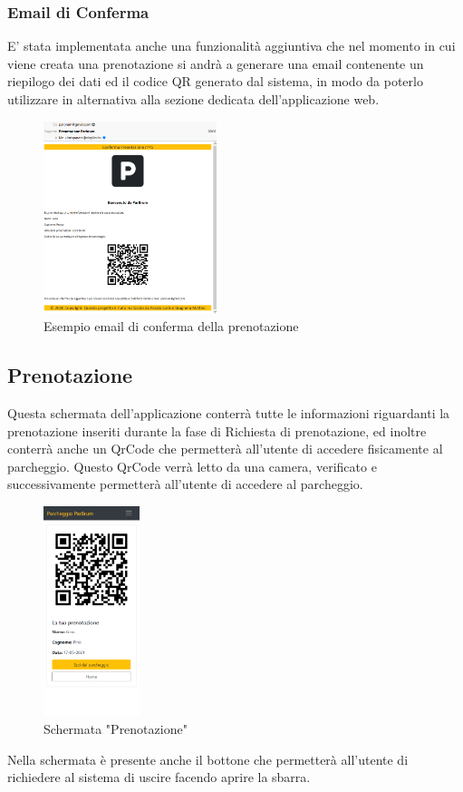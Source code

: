 \documentclass[a4paper,11pt]{report}
\begin{document}
\subsubsection{Email di Conferma}
E' stata implementata anche una funzionalità aggiuntiva che nel momento in cui viene creata una prenotazione si andrà a generare una email contenente un riepilogo dei dati ed il codice QR generato dal sistema, in modo da poterlo utilizzare in alternativa alla sezione dedicata dell'applicazione web.
\begin{figure}[H]
	\centering
	\includegraphics[width=0.45\textwidth]{figure/email_parbrum.PNG}
	\caption{Esempio email di conferma della prenotazione }
	\label{fig:conferma_prenotazione}
\end{figure}

\subsection{Prenotazione}
Questa schermata dell'applicazione conterrà tutte le informazioni riguardanti la prenotazione inseriti durante la fase di Richiesta di prenotazione, ed inoltre conterrà anche un QrCode che permetterà all'utente di accedere fisicamente al parcheggio. Questo QrCode verrà letto da una camera, verificato e successivamente permetterà all'utente di accedere al parcheggio. \newline
\begin{figure}[H]
    \centering
    \includegraphics[width=0.25\textwidth]{prenotazione_effettuata.png}
    \caption{Schermata "Prenotazione"}
    \label{fig:prenotazione}
\end{figure}
Nella schermata è presente anche il bottone che permetterà all'utente di richiedere al sistema di uscire facendo aprire la sbarra.
\end{document}
